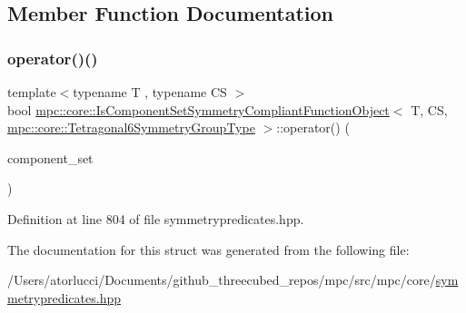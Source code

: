 \subsection{Member Function Documentation}
\mbox{\label{structmpc_1_1core_1_1_is_component_set_symmetry_compliant_function_object_3_01_t_00_01_c_s_00_01d026bbfe93e923dfb312d1f5251cf8bf_a8438f1a4ac1636b5c1ee7310bf6b8497}} 
\subsubsection{\texorpdfstring{operator()()}{operator()()}}
{\footnotesize\ttfamily template$<$typename T , typename CS $>$ \\
bool \mbox{\hyperlink{structmpc_1_1core_1_1_is_component_set_symmetry_compliant_function_object}{mpc\+::core\+::\+Is\+Component\+Set\+Symmetry\+Compliant\+Function\+Object}}$<$ T, CS, \mbox{\hyperlink{structmpc_1_1core_1_1_tetragonal6_symmetry_group_type}{mpc\+::core\+::\+Tetragonal6\+Symmetry\+Group\+Type}} $>$\+::operator() (\begin{DoxyParamCaption}\item[{const std\+::set$<$ \mbox{\hyperlink{namespacempc_1_1core_ac3a232afc7c680d580628e834030482f}{mpc\+::core\+::\+Tensor\+Rank4\+Component}}$<$ T $>$ $>$ \&}]{component\+\_\+set }\end{DoxyParamCaption})\hspace{0.3cm}{\ttfamily [inline]}}



Definition at line 804 of file symmetrypredicates.\+hpp.



The documentation for this struct was generated from the following file\+:\begin{DoxyCompactItemize}
\item 
/\+Users/atorlucci/\+Documents/github\+\_\+threecubed\+\_\+repos/mpc/src/mpc/core/\mbox{\hyperlink{symmetrypredicates_8hpp}{symmetrypredicates.\+hpp}}\end{DoxyCompactItemize}
